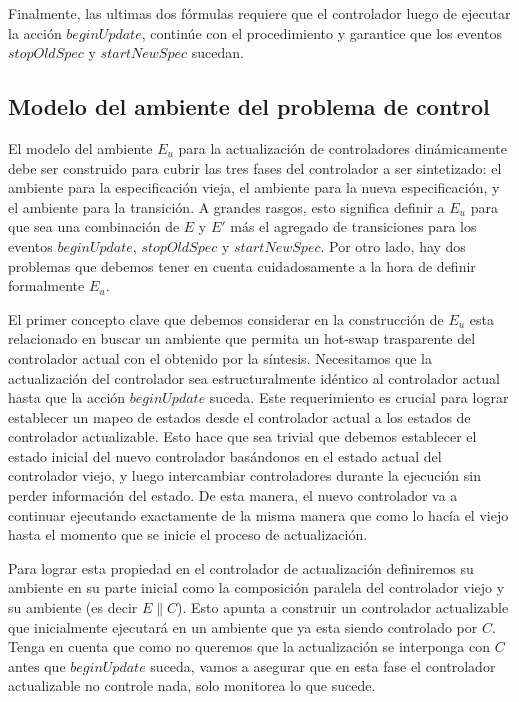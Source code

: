 Finalmente, las ultimas dos fórmulas requiere que el controlador luego de ejecutar la acción $beginUpdate$, continúe con
el procedimiento y garantice que los eventos $stopOldSpec$ y $startNewSpec$ sucedan.

\subsection{Modelo del ambiente del problema de control}

El modelo del ambiente $E_u$ para la actualización de controladores dinámicamente debe ser construido para cubrir las
tres fases del controlador a ser sintetizado: el ambiente para la especificación vieja, el ambiente para la nueva
especificación, y el ambiente para la transición. A grandes rasgos, esto significa definir a $E_u$ para que sea una
combinación de $E$ y $E'$ más el agregado de transiciones para los eventos $beginUpdate$, $stopOldSpec$ y
$startNewSpec$. Por otro lado, hay dos problemas que debemos tener en cuenta cuidadosamente a la hora de definir
formalmente $E_u$.

El primer concepto clave que debemos considerar en la construcción de $E_u$ esta relacionado en buscar un ambiente que
permita un hot-swap trasparente del controlador actual con el obtenido por la síntesis. Necesitamos que la actualización
del controlador sea estructuralmente idéntico al controlador actual hasta que la acción $beginUpdate$ suceda. Este
requerimiento es crucial para lograr establecer un mapeo de estados desde el controlador actual a los estados de controlador
actualizable. Esto hace que sea trivial que debemos establecer el estado inicial del nuevo controlador basándonos en el
estado actual del controlador viejo, y luego intercambiar controladores durante la ejecución sin perder información del
estado. De esta manera, el nuevo controlador va a continuar ejecutando exactamente de la misma manera que como lo hacía
el viejo hasta el momento que se inicie el proceso de actualización.

Para lograr esta propiedad en el controlador de actualización definiremos su ambiente en su parte inicial como la
composición paralela del controlador viejo y su ambiente (es decir $E\|C$). Esto apunta a construir un controlador
actualizable que inicialmente ejecutará en un ambiente que ya esta siendo controlado por $C$. Tenga en cuenta que como
no queremos que la actualización se interponga con $C$ antes que $beginUpdate$ suceda, vamos a asegurar que en esta fase
el controlador actualizable no controle nada, solo monitorea lo que sucede.

